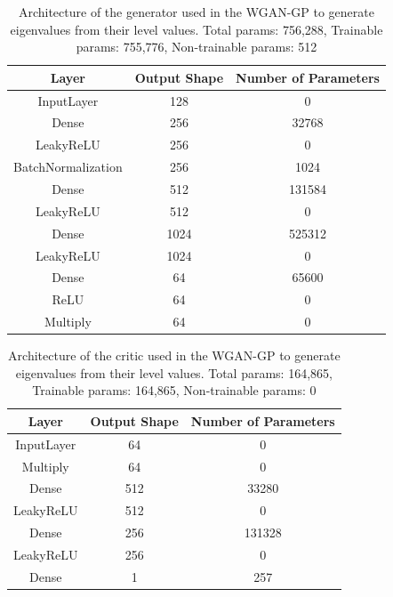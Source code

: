 \documentclass[11pt,a4paper,twoside]{report}
\begin{document}
\begin{table}[]
  \centering
  \begin{tabular}{c c c}
      \hline
      \textbf{Layer} & \textbf{Output Shape} & \textbf{Number of Parameters} \\ \hline
      InputLayer            & 128           & 0                 \\
      Dense                 & 256           & 32768             \\
      LeakyReLU             & 256           & 0                 \\
      BatchNormalization    & 256           & 1024              \\
      Dense                 & 512           & 131584            \\
      LeakyReLU             & 512           & 0                 \\
      Dense                 & 1024          & 525312            \\
      LeakyReLU             & 1024          & 0                 \\
      Dense                 & 64            & 65600             \\
      ReLU                  & 64            & 0                 \\
      Multiply              & 64            & 0                 \\
  \end{tabular}
  \caption{Architecture of the generator used in the WGAN-GP to generate eigenvalues from their level values. Total params: 756,288, Trainable params: 755,776, Non-trainable params: 512}
  \label{tab:evals_dB_generator_WGANGP_architecture}
\end{table}

\begin{table}[]
  \centering
  \begin{tabular}{c c c}
      \hline
      \textbf{Layer} & \textbf{Output Shape} & \textbf{Number of Parameters} \\ \hline
      InputLayer            & 64            & 0                 \\
      Multiply              & 64            & 0                 \\
      Dense                 & 512           & 33280             \\
      LeakyReLU             & 512           & 0                 \\
      Dense                 & 256           & 131328            \\
      LeakyReLU             & 256           & 0                 \\
      Dense                 & 1             & 257               \\
  \end{tabular}
  \caption{Architecture of the critic used in the WGAN-GP to generate eigenvalues from their level values. Total params: 164,865, Trainable params: 164,865, Non-trainable params: 0}
  \label{tab:evals_dB_critic_WGANGP_architecture}
\end{table}
\end{document}
